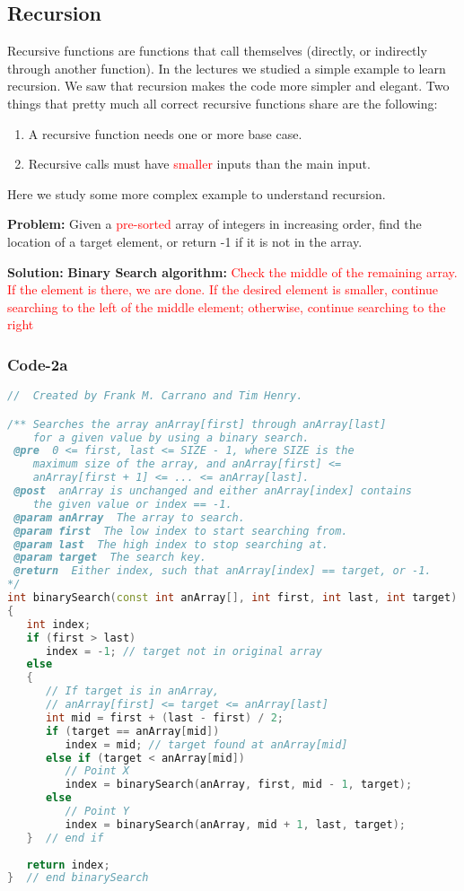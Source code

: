 \documentclass{article}
\newcommand{\red}[1]{\textcolor{red}{#1}}
\begin{document}
\subsection*{Recursion}
Recursive functions are functions that call themselves (directly, or indirectly through another function). In the lectures we studied a simple example to learn recursion. We saw that recursion makes the code more simpler and elegant. Two things that pretty much all correct recursive functions share are the following:

\begin{enumerate}
\item A recursive function needs one or more base case.
\item Recursive calls must have \red{smaller} inputs than the main input.
\end{enumerate}
Here we study some more complex example to understand recursion.

\medskip

\textbf{Problem:} Given a \red{pre-sorted} array of integers in increasing order, find the location of a target element, or return -1
if it is not in the array. 

\medskip

\textbf{Solution:} \textbf{Binary Search algorithm:} \red{Check the middle of the remaining array. If the
element is there, we are done. If the desired element is smaller, continue searching to the left of the middle
element; otherwise, continue searching to the right}

\subsubsection*{Code-2a}
\begin{lstlisting}[language=C++]
//  Created by Frank M. Carrano and Tim Henry.

/** Searches the array anArray[first] through anArray[last]
    for a given value by using a binary search.
 @pre  0 <= first, last <= SIZE - 1, where SIZE is the
    maximum size of the array, and anArray[first] <=
    anArray[first + 1] <= ... <= anArray[last].
 @post  anArray is unchanged and either anArray[index] contains
    the given value or index == -1.
 @param anArray  The array to search.
 @param first  The low index to start searching from.
 @param last  The high index to stop searching at.
 @param target  The search key.
 @return  Either index, such that anArray[index] == target, or -1.
*/
int binarySearch(const int anArray[], int first, int last, int target)
{
   int index;
   if (first > last)
      index = -1; // target not in original array
   else
   {
      // If target is in anArray,
      // anArray[first] <= target <= anArray[last]
      int mid = first + (last - first) / 2;
      if (target == anArray[mid])
         index = mid; // target found at anArray[mid]
      else if (target < anArray[mid])
         // Point X
         index = binarySearch(anArray, first, mid - 1, target);
      else
         // Point Y
         index = binarySearch(anArray, mid + 1, last, target);
   }  // end if
   
   return index;
}  // end binarySearch

\end{lstlisting}
\end{document}
